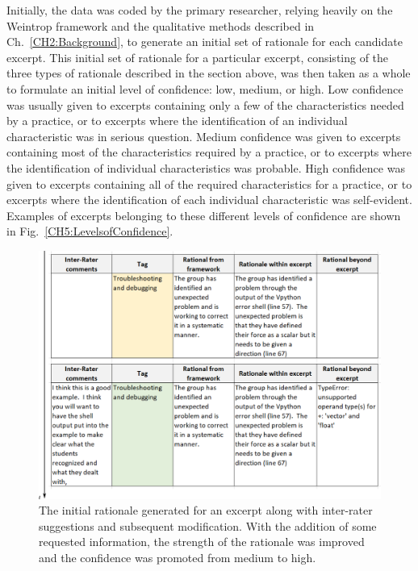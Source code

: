 \documentclass{msuphddissertation}
\begin{document}
\begin{doublespace}
Initially, the data was coded by the primary researcher, relying heavily on the Weintrop framework and the qualitative methods described in Ch.~\ref{CH2:Background}, to generate an initial set of rationale for each candidate excerpt.  This initial set of rationale for a particular excerpt, consisting of the three types of rationale described in the section above, was then taken as a whole to formulate an initial level of confidence: low, medium, or high.  Low confidence was usually given to excerpts containing only a few of the characteristics needed by a practice, or to excerpts where the identification of an individual characteristic was in serious question.  Medium confidence was given to excerpts containing most of the characteristics required by a practice, or to excerpts where the identification of individual characteristics was probable.  High confidence was given to excerpts containing all of the required characteristics for a practice, or to excerpts where the identification of each individual characteristic was self-evident.  Examples of excerpts belonging to these different levels of confidence are shown in Fig.~\ref{CH5:LevelsofConfidence}.

\begin{figure}\centering
\includegraphics[scale=0.5]{./images/CH5Reliability.pdf}
\caption{The initial rationale generated for an excerpt along with inter-rater suggestions and subsequent modification.  With the addition of some requested information, the strength of the rationale was improved and the confidence was promoted from medium to high.}\label{CH5:Reliability}
\end{figure}


\end{doublespace}
\end{document}
